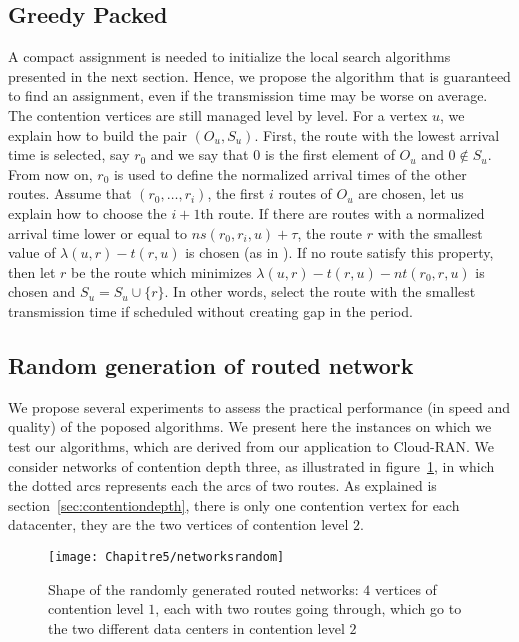 

\subsection{Greedy Packed}


A compact assignment is needed to initialize the local search algorithms presented in the next section. Hence, we propose the \greedypacked algorithm that is guaranteed to find an assignment, even if the transmission time may be worse on average.
The contention vertices are still managed level by level. For a vertex $u$, we explain how to build the pair $(O_u,S_u)$. First, the route with the lowest arrival time is selected, say $r_0$ and we say that $0$ is the first element of $O_u$ and $0 \notin S_u$. From now on, $r_0$ is used to define the normalized arrival times of the other routes. Assume that $(r_0,\dots,r_i)$, the first $i$ routes of $O_u$ are chosen, let us explain how to choose the $i+1$th route. If there are routes with a normalized arrival time lower or equal to $ns(r_0,r_i,u)+\tau$, the route $r$ with the smallest value of $\lambda(u,r) - t(r,u)$ is chosen (as in \greedynormalized). If no route satisfy this property, then let $r$ be the route which minimizes $\lambda(u,r) - t(r,u) - nt(r_0,r,u)$ is chosen and $S_u = S_u \cup \{r\}$. In other words, select the route with the smallest transmission time if scheduled without creating gap in the period.


\subsection{Random generation of routed network}

We propose several experiments to assess the practical performance (in speed and quality) of the poposed algorithms. We present here the instances on which we test our algorithms, which are derived from our application to Cloud-RAN. We consider networks of contention depth three, as illustrated in figure~\ref{fig:randomnetworks}, in which the dotted arcs represents each the arcs of two routes. As explained is section~\ref{sec:contentiondepth}, there is only one contention vertex for each datacenter, they are the two vertices of contention level $2$.
   \begin{figure} 
	\centering
	\texttt{[image: Chapitre5/networksrandom]}

\caption{Shape of the randomly generated routed networks: $4$ vertices of contention level $1$, each with two routes going through, which go to the two different data centers in contention level $2$}
\label{fig:randomnetworks}
\end{figure}

